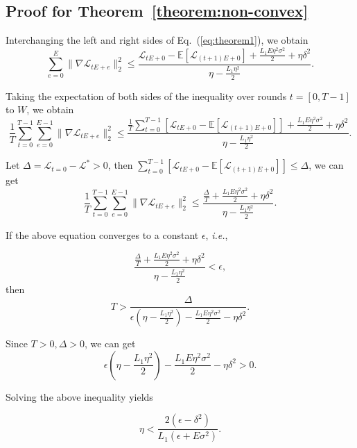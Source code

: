 \documentclass[sigconf]{acmart}
\begin{document}
\subsection{Proof for Theorem~\ref{theorem:non-convex}}
Interchanging the left and right sides of Eq.~(\ref{eq:theorem1}), we obtain
\begin{equation}
\sum_{e=0}^E\|\nabla \mathcal{L}_{t E+e}\|_2^2 \leq \frac{\mathcal{L}_{t E+0}-\mathbb{E}[\mathcal{L}_{(t+1) E+0}]+\frac{L_1 E \eta^2 \sigma^2}{2}+\eta \delta^2}{\eta-\frac{L_1 \eta^2}{2}}.
\end{equation}

Taking the expectation of both sides of the inequality over rounds $t= [0, T-1]$ to $W$, we obtain
\begin{equation}
\frac{1}{T} \sum_{t=0}^{T-1} \sum_{e=0}^{E-1}\|\nabla \mathcal{L}_{t E+e}\|_2^2 \leq \frac{\frac{1}{T} \sum_{t=0}^{T-1}[\mathcal{L}_{t E+0}-\mathbb{E}[\mathcal{L}_{(t+1) E+0}]]+\frac{L_1 E \eta^2 \sigma^2}{2}+\eta \delta^2}{\eta-\frac{L_1 \eta^2}{2}}.
\end{equation}

Let $\Delta=\mathcal{L}_{t=0} - \mathcal{L}^* > 0$, then $\sum_{t=0}^{T-1}[\mathcal{L}_{t E+0}-\mathbb{E}[\mathcal{L}_{(t+1) E+0}]] \leq \Delta$, we can get 
\begin{equation}\label{eq:theorem2}
\frac{1}{T} \sum_{t=0}^{T-1} \sum_{e=0}^{E-1}\|\nabla \mathcal{L}_{t E+e}\|_2^2 \leq \frac{\frac{\Delta}{T}+\frac{L_1 E \eta^2 \sigma^2}{2}+\eta \delta^2}{\eta-\frac{L_1 \eta^2}{2}}.
\end{equation}

If the above equation converges to a constant $\epsilon$, \emph{i.e.},

\begin{equation}
\frac{\frac{\Delta}{T}+\frac{L_1 E \eta^2 \sigma^2}{2}+\eta \delta^2}{\eta-\frac{L_1 \eta^2}{2}}<\epsilon,
\end{equation}
then 
\begin{equation}
T>\frac{\Delta}{\epsilon(\eta-\frac{L_1 \eta^2}{2})-\frac{L_1 E \eta^2 \sigma^2}{2}-\eta \delta^2}.
\end{equation}

Since $T>0, \Delta>0$, we can get
\begin{equation}
\epsilon(\eta-\frac{L_1 \eta^2}{2})-\frac{L_1 E \eta^2 \sigma^2}{2}-\eta \delta^2>0.
\end{equation}

Solving the above inequality yields

\begin{equation}
\eta<\frac{2(\epsilon-\delta^2)}{L_1(\epsilon+E \sigma^2)}.
\end{equation}
\end{document}
